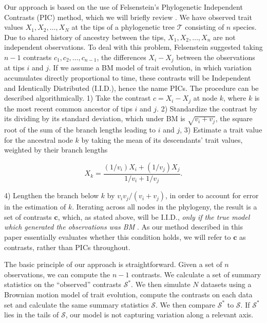 \documentclass[12pt]{article}
\begin{document}
Our approach is based on the use of Felsenstein's \citeyear{Felsenstein1973, Felsenstein1985} Phylogenetic Independent Contrasts (PIC) method, which we will briefly review \citep[for more details, see][]{Rohlf2001, Blomberg2012}. We have observed trait values $X_1, X_2, \ldots, X_N$ at the tips of a phylogenetic tree $\mathcal{T}$ consisting of $n$ species. Due to shared history of ancestry between the tips, $X_1, X_2, \ldots, X_n$ are not independent observations. To deal with this problem, Felsenstein suggested taking $n-1$ contrasts $c_1, c_2, \ldots, c_{n-1}$, the differences $X_{i} - X_{j}$ between the observations at tips $i$ and $j$. If we assume a BM model of trait evolution, in which variation accumulates directly proportional to time, these contrasts will be Independent and Identically Distributed (I.I.D.), hence the name PICs. The procedure can be described algorithmically. 1) Take the contrast $c = X_i - X_j$ at node $k$, where $k$ is the most recent common ancestor of tips $i$ and $j$. 2) Standardize the contrast by its dividing by its standard deviation, which under BM is $\sqrt{v_i + v_j}$, the square root of the sum of the branch lengths leading to $i$ and $j$, 3) Estimate a trait value for the ancestral node $k$ by taking the mean of its descendants' trait values, weighted by their branch lengths

\begin{equation}
X_k = \frac{(1 / v_i)X_i + (1 / v_j)X_j}{1/v_i + 1/v_j}.
\end{equation}

4) Lengthen the branch below $k$ by $v_i v_j / (v_i + v_j)$, in order to account for error in the estimation of $k$. Iterating across all nodes in the phylogeny, the result is a set of contrasts $\mathbf{c}$, which, as stated above, will be I.I.D., \textit{only if the true model which generated the observations was BM} \citep{Rohlf2001}. As our method described in this paper essentially evaluates whether this condition holds, we will refer to $\mathbf{c}$ as contrasts, rather than PICs throughout. 

The basic principle of our approach is straightforward. Given a set of $n$ observations, we can compute the $n-1$ contrasts. We calculate a set of summary statistics on the ``observed'' contrasts $\mathcal{S}^*$. We then simulate $N$ datasets using a Brownian motion model of trait evolution, compute the contrasts on each data set and calculate the same summary statistics $\mathcal{S}$. We then compare $\mathcal{S}^*$ to $\mathcal{S}$. If $\mathcal{S}^*$ lies in the tails of $\mathcal{S}$, our model is not capturing variation along a relevant axis. 
\end{document}
